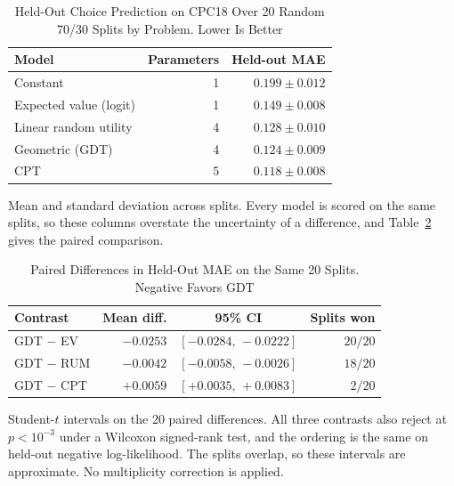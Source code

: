 \documentclass[journal]{IEEEtran}
\begin{document}
\begin{table}[!t]
\renewcommand{\arraystretch}{1.15}
\caption{Held-Out Choice Prediction on CPC18 Over 20 Random 70/30 Splits by Problem. Lower Is Better}
\label{tab:cpc18}
\centering
\begin{tabular}{l r r}
\toprule
\textbf{Model} & \textbf{Parameters} & \textbf{Held-out MAE} \\
\midrule
Constant                 & 1 & $0.199 \pm 0.012$ \\
Expected value (logit)   & 1 & $0.149 \pm 0.008$ \\
Linear random utility    & 4 & $0.128 \pm 0.010$ \\
Geometric (GDT)          & 4 & $0.124 \pm 0.009$ \\
CPT                      & 5 & $0.118 \pm 0.008$ \\
\bottomrule
\end{tabular}
\begin{flushleft}
\footnotesize{Mean and standard deviation across splits. Every model is scored on the same splits, so these columns overstate the uncertainty of a difference, and Table~\ref{tab:cpc18paired} gives the paired comparison.}
\end{flushleft}
\end{table}

\begin{table}[!t]
\renewcommand{\arraystretch}{1.15}
\caption{Paired Differences in Held-Out MAE on the Same 20 Splits. Negative Favors GDT}
\label{tab:cpc18paired}
\centering
\begin{tabular}{l r c r}
\toprule
\textbf{Contrast} & \textbf{Mean diff.} & \textbf{95\% CI} & \textbf{Splits won} \\
\midrule
GDT $-$ EV  & $-0.0253$ & $[-0.0284,\,-0.0222]$ & $20/20$ \\
GDT $-$ RUM & $-0.0042$ & $[-0.0058,\,-0.0026]$ & $18/20$ \\
GDT $-$ CPT & $+0.0059$ & $[+0.0035,\,+0.0083]$ & $2/20$ \\
\bottomrule
\end{tabular}
\begin{flushleft}
\footnotesize{Student-$t$ intervals on the 20 paired differences. All three contrasts also reject at $p<10^{-3}$ under a Wilcoxon signed-rank test, and the ordering is the same on held-out negative log-likelihood. The splits overlap, so these intervals are approximate. No multiplicity correction is applied.}
\end{flushleft}
\end{table}
\end{document}
